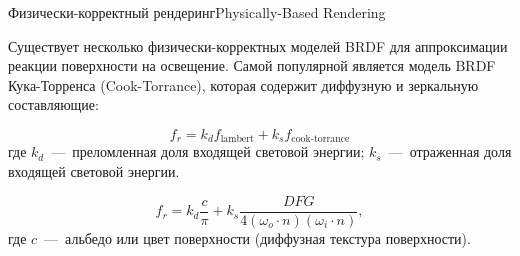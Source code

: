 \documentclass{beamer}
\begin{document}
	\begin{frame}{Физически-корректный рендеринг}{Physically-Based Rendering}

		Существует несколько физически-корректных моделей BRDF для аппроксимации реакции поверхности на освещение. Самой популярной является модель BRDF Кука-Торренса 
		(Cook-Torrance), которая содержит диффузную и зеркальную составляющие:
		
		\[
			f_r =
			k_d f_{\text{lambert}}
			+
			k_s f_{\text{cook-torrance}} 	
		\]
		где 
		$k_d$~---~преломленная доля входящей световой энергии;
		$k_s$~---~отраженная доля входящей световой энергии.

		\[
			f_r =
			k_d \frac{c}{\pi} 
			+
			k_s \frac{DFG}{4 (\omega_o \cdot n) (\omega_i \cdot n)} 	
		,
			\]
		где 
		$c$~---~альбедо или цвет поверхности (диффузная текстура поверхности).

		
		
		
		\note{


			
		}
	\end{frame}
\end{document}
